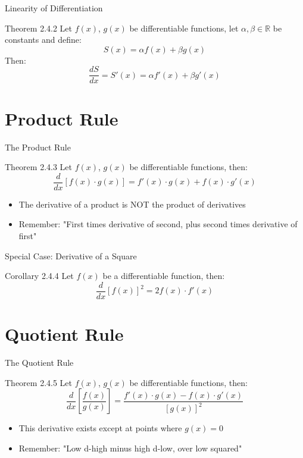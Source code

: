 \documentclass[aspectratio=169]{beamer}
\begin{document}
\begin{frame}{Linearity of Differentiation}
\begin{block}{Theorem 2.4.2}
Let $f(x)$, $g(x)$ be differentiable functions, let $\alpha, \beta \in \mathbb{R}$ be constants and define:
\[
S(x) = \alpha f(x) + \beta g(x)
\]
Then:
\[
\frac{dS}{dx} = S'(x) = \alpha f'(x) + \beta g'(x)
\]
\end{block}
\end{frame}

\section{Product Rule}

\begin{frame}{The Product Rule}
\begin{block}{Theorem 2.4.3}
Let $f(x)$, $g(x)$ be differentiable functions, then:
\[
\frac{d}{dx}[f(x) \cdot g(x)] = f'(x) \cdot g(x) + f(x) \cdot g'(x)
\]
\end{block}
\begin{itemize}
  \item The derivative of a product is NOT the product of derivatives
  \item Remember: "First times derivative of second, plus second times derivative of first"
\end{itemize}
\end{frame}

\begin{frame}{Special Case: Derivative of a Square}
\begin{block}{Corollary 2.4.4}
Let $f(x)$ be a differentiable function, then:
\[
\frac{d}{dx}[f(x)]^2 = 2f(x) \cdot f'(x)
\]
\end{block}
\end{frame}

\section{Quotient Rule}

\begin{frame}{The Quotient Rule}
\begin{block}{Theorem 2.4.5}
Let $f(x)$, $g(x)$ be differentiable functions, then:
\[
\frac{d}{dx}\left[\frac{f(x)}{g(x)}\right] = \frac{f'(x) \cdot g(x) - f(x) \cdot g'(x)}{[g(x)]^2}
\]
\end{block}
\begin{itemize}
  \item This derivative exists except at points where $g(x) = 0$
  \item Remember: "Low d-high minus high d-low, over low squared"
\end{itemize}
\end{frame}
\end{document}
